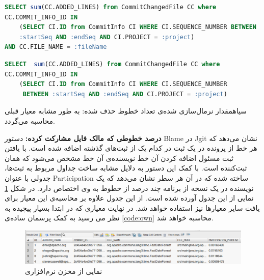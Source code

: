 \begin{latin}
	\begin{lstlisting}[language=SQL]
SELECT sum(CC.ADDED_LINES) from CommitChangedFile CC where
CC.COMMIT_INFO_ID IN
	(SELECT CI.ID from CommitInfo CI WHERE CI.SEQUENCE_NUMBER BETWEEN 
	:startSeq AND :endSeq AND CI.PROJECT = :project)
AND CC.FILE_NAME = :fileName
	\end{lstlisting}
\end{latin}
\label{code:added-line-file}

\begin{latin}
\begin{lstlisting}[language=SQL]
SELECT  sum(CC.ADDED_LINES) from CommitChangedFile CC where 
CC.COMMIT_INFO_ID IN
	(SELECT CI.ID from CommitInfo CI WHERE CI.SEQUENCE_NUMBER
	 BETWEEN :startSeq AND :endSeq AND CI.PROJECT = :project)
\end{lstlisting}
\end{latin}
\label{code:added-line-project}

‌سیاه{‫مقدار نرمال‌سازی شده‌ی تعداد خطوط حذف شده:‬} به طور مشابه معیار قبلی محاسبه می‌گردد.

\textbf{درصد خطوطی که مالک فایل مشارکت کرده:}
دستور Blame در Jgit نشان می‌دهد که هر خط از پرونده در یک ثبت  در کدام یک از ثبت‌های گذشته اضافه شده است.  با یافتن ثبت مسئول اضافه کردن آن خط نویسنده‌ی آن خط مشخص می‌شود که همان ثبت‌کننده است. با کمک این دستور به دلایل مشابه ساخت جداول مربوط به ثبت‌ها، جدولی با عنوان Participation ساخته شده که در آن هر سطر نشان می‌دهد که یک نویسنده در یک نسخه از برنامه چند درصد از خطوط به وی اختصاص دارد. در شکل \ref{fig:participation} نمایی از این جدول آورده شده است.  از این جدول علاوه بر محاسبه‌ی این معیار برای یافت سایر معیارها نیز استفاده خواهد شد. در نهایت معیاری که در ابتدا بسیار پیچیده به نظر می رسید به کمک پرسمان ساده‌ی \ref{code:own} محاسبه خواهد شد. 

\begin{figure}[H]
	\centering
	\includegraphics[width=1\textwidth]{img/case_study/participation.png}
	\caption{نمایی از مخزن نرم‌افزاری}
	\label{fig:participation}
\end{figure}


